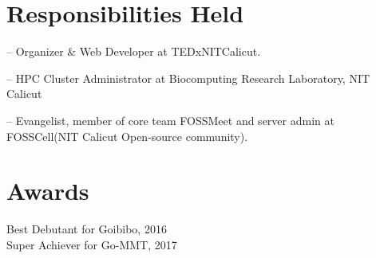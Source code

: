 \documentclass[margin,line]{resume}
\begin{document}
\begin{resume}

            


		    			

    \section{\mysidestyle Responsibilities Held } 
	\begin{list2}
	\item[--] Organizer \& Web Developer at TEDxNITCalicut.
	\item[--] HPC Cluster Administrator at Biocomputing Research Laboratory, NIT Calicut
	\item[--] Evangelist,  member of core team FOSSMeet and server admin at FOSSCell(NIT Calicut Open-source community).
	
	
	\end{list2}
    \section{\mysidestyle Awards} 
         Best Debutant for Goibibo, 2016  \\
	Super Achiever for Go-MMT, 2017   


\end{resume}
\end{document}

